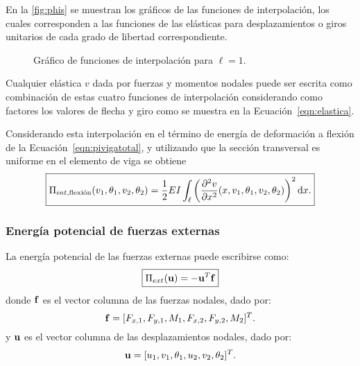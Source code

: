 En la \autoref{fig:phis} se muestran los gráficos de las funciones de interpolación, los cuales corresponden a las funciones de las elásticas para desplazamientos o giros unitarios de cada grado de libertad correspondiente. %
%


%
\begin{figure}[htb]
	\centering
	\caption{Gráfico de funciones de interpolación para $\ell=1$.}
	\label{fig:phis}
\end{figure}


Cualquier elástica $v$ dada por fuerzas y momentos nodales puede ser escrita como combinación de estas cuatro funciones de interpolación considerando como factores los valores de flecha y giro como se muestra en la Ecuación~\eqref{eqn:elastica}. %

Considerando esta interpolación en el término de energía de deformación a flexión de la Ecuación~\eqref{eqn:pivigatotal}, y utilizando que la sección transversal es uniforme en el elemento de viga se obtiene
%
\begin{equation} \label{eqn:Uflex}
	\boxed{
	\Pi_{int,\text{flexión}} (v_1,\theta_1,v_2,\theta_2) = \frac{1}{2} E I \int_{\ell} \left( \frac{\partial ^2 v}{\partial x^2}(x,v_1,\theta_1,v_2,\theta_2) \right)^2{\text{d}} x .
	}
\end{equation}



\subsubsection{Energía potencial de fuerzas externas}

La energía potencial de las fuerzas externas puede escribirse como:
\begin{equation}
	\boxed{
	\Pi_{ext} ({\bf u}) = - {\bf u}^T {\bf f}
	}
\end{equation}
%
donde ${\bf f}$ es el vector columna de las fuerzas nodales, dado por:
%
\begin{equation}
	{\bf f} = [F_{x,1},F_{y,1},M_{1}, F_{x,2},F_{y,2},M_{2} ]^T.
\end{equation}
%
y ${\bf u}$ es el vector columna de las desplazamientos nodales, dado por:
%
\begin{equation}
	{\bf u} = [u_1,v_1,\theta_1,  u_2,v_2,\theta_2 ]^T.
\end{equation}

